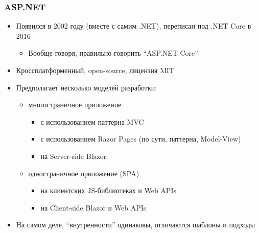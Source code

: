 \documentclass{../../slides-style}
\begin{document}
    \begin{frame}
        \frametitle{ASP.NET}
        \begin{itemize}
            \item Появился в 2002 году (вместе с самим .NET), переписан под .NET Core в 2016
            \begin{itemize}
                \item Вообще говоря, правильно говорить \enquote{ASP.NET Core}
            \end{itemize}
            \item Кроссплатформенный, open-source, лицензия MIT
            \item Предполагает несколько моделей разработки:
            \begin{itemize}
                \item многостраничное приложение
                \begin{itemize}
                    \item с использованием паттерна MVC
                    \item с использованием Razor Pages (по сути, паттерна, Model-View)
                    \item на Server-side Blazor
                \end{itemize}
                \item одностраничное приложение (SPA)
                \begin{itemize}
                    \item на клиентских JS-библиотеках и Web APIs
                    \item на Client-side Blazor и Web APIs
                \end{itemize}
            \end{itemize}
            \item На самом деле, \enquote{внутренности} одинаковы, отличаются шаблоны и подходы
        \end{itemize}
    \end{frame}
\end{document}
